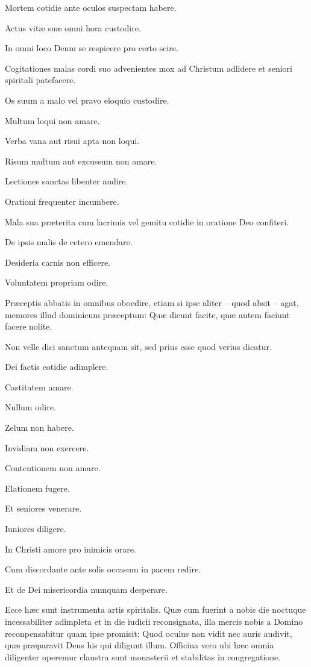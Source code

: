 \documentclass[fontsize=9pt,paper=A6,twoside,BCOR=1mm,DIV=22,headinclude]{scrarticle}
\begin{document}
\begin{multicols}{2}
\begin{psalmus}
Mortem cotidie ante oculos suspectam habere. 

Actus vitæ suæ omni hora custodire. 

In omni loco Deum se respicere pro certo scire. 

Cogitationes malas cordi suo advenientes mox ad Christum adlidere et seniori spiritali patefacere.

Os suum a malo vel pravo eloquio custodire. 

Multum loqui non amare. 

Verba vana aut risui apta non loqui. 

Risum multum aut excussum non amare. 

Lectiones sanctas libenter audire.

Orationi frequenter incumbere. 

Mala sua præterita cum lacrimis vel gemitu cotidie in oratione Deo confiteri. 

De ipsis malis de cetero emendare. 

Desideria carnis non efficere. 

Voluntatem propriam odire. 

Præceptis abbatis in omnibus oboedire, etiam si ipse aliter – quod absit – agat, memores illud dominicum præceptum: Quæ dicunt facite, quæ autem faciunt facere nolite. 

Non velle dici sanctum antequam sit, sed prius esse quod verius dicatur.
\end{psalmus}

\begin{psalmus}
 Dei factis cotidie adimplere. 

Castitatem amare. 

Nullum odire. 

Zelum non habere. 

Invidiam non exercere. 

Contentionem non amare. 

Elationem fugere. 

Et seniores venerare. 

Iuniores diligere. 

In Christi amore pro inimicis orare. 

Cum discordante ante solis occasum in pacem redire. 

Et de Dei misericordia numquam desperare.
\end{psalmus}

Ecce hæc sunt instrumenta artis spiritalis. Quæ cum fuerint a nobis die noctuque incessabiliter adimpleta et in die iudicii reconsignata, illa mercis nobis a Domino reconpensabitur quam ipse promisit: Quod oculus non vidit nec auris audivit, quæ præparavit Deus his qui diligunt illum. Officina vero ubi hæc omnia diligenter operemur claustra sunt monasterii et stabilitas in congregatione. 


\end{multicols}
\end{document}
